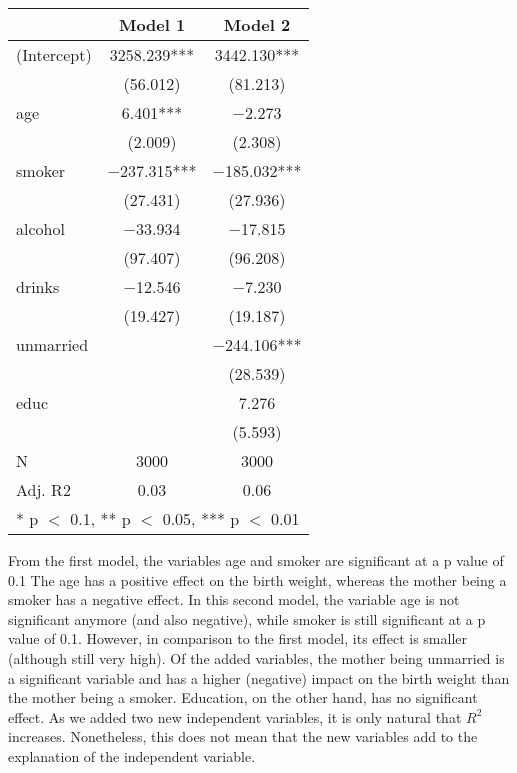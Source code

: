 \documentclass[
]{article}
\begin{document}
\begin{table}
\centering
\begin{tabular}[t]{lcc}
\toprule
  & Model 1 & Model 2\\
\midrule
(Intercept) & \num{3258.239}*** & \num{3442.130}***\\
 & (\num{56.012}) & (\num{81.213})\\
age & \num{6.401}*** & \num{-2.273}\\
 & (\num{2.009}) & (\num{2.308})\\
smoker & \num{-237.315}*** & \num{-185.032}***\\
 & (\num{27.431}) & (\num{27.936})\\
alcohol & \num{-33.934} & \num{-17.815}\\
 & (\num{97.407}) & (\num{96.208})\\
drinks & \num{-12.546} & \num{-7.230}\\
 & (\num{19.427}) & (\num{19.187})\\
unmarried &  & \num{-244.106}***\\
 &  & (\num{28.539})\\
educ &  & \num{7.276}\\
 &  & (\num{5.593})\\
\midrule
N & \num{3000} & \num{3000}\\
Adj. R2 & \num{0.03} & \num{0.06}\\
\bottomrule
\multicolumn{3}{l}{\rule{0pt}{1em}* p $<$ 0.1, ** p $<$ 0.05, *** p $<$ 0.01}\\
\end{tabular}
\end{table}

\normalsize

From the first model, the variables age and smoker are significant at a
p value of 0.1 The age has a positive effect on the birth weight,
whereas the mother being a smoker has a negative effect. In this second
model, the variable age is not significant anymore (and also negative),
while smoker is still significant at a p value of 0.1. However, in
comparison to the first model, its effect is smaller (although still
very high). Of the added variables, the mother being unmarried is a
significant variable and has a higher (negative) impact on the birth
weight than the mother being a smoker. Education, on the other hand, has
no significant effect. As we added two new independent variables, it is
only natural that \(R^2\) increases. Nonetheless, this does not mean
that the new variables add to the explanation of the independent
variable.
\end{document}
